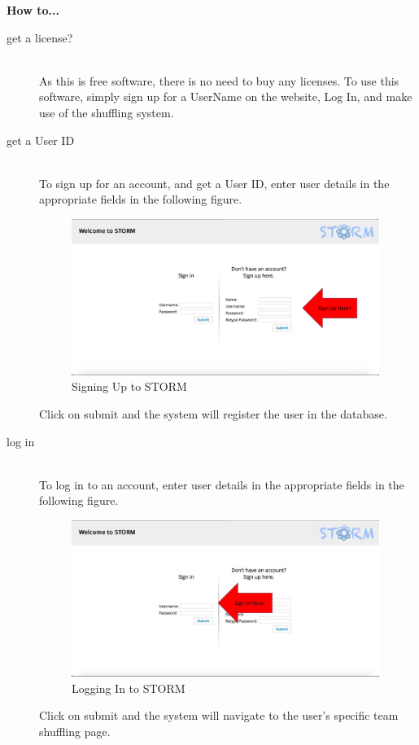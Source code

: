 {\Large \textbf{How to...} \par}

\begin{description}
 	\item[get a license?] \hfill \\
 		As this is free software, there is no need to buy any licenses. To use this software, simply 
		sign up for a UserName on the website, Log In, and make use of the shuffling system.
 	\item[get a User ID] \hfill \\
		To sign up for an account, and get a User ID, enter user details in the appropriate fields in the 		following figure.\par
		 \begin{figure}[h!] 
		 \centering
		 \includegraphics[width=10cm]{./graphics/StormUMSU1.jpg}
		 \caption{Signing Up to STORM}
		 \end{figure}
   		Click on submit and the system will register the user in the database.
	\item[log in] \hfill \\
 		To log in to an account, enter user details in the appropriate fields in the following figure.\par
   		\begin{figure}[h!] 
		\centering 
		\includegraphics[width=10cm]{./graphics/StormUMSU2.jpg}
		\caption{Logging In to STORM}
		\end{figure}
   		Click on submit and the system will navigate to the user's specific team shuffling page.

\end{description}
